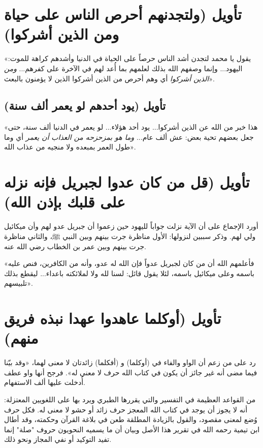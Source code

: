 \separator

\section{تأويل (ولتجدنهم أحرص الناس على حياة ومن الذين أشركوا)}
 «يقول يا محمد لتجدن أشد الناس حرصاً على الحياة في الدنيا وأشدهم كراهة للموت: اليهود... وإنما وصفهم الله بذلك لعلمهم بما أُعد لهم في الآخرة على كفرهم... \textit{ومن الذين أشركوا} أي وهم أحرص من الذين أشركوا الذين لا يؤمنون بالبعث».

\subsection{تأويل (يود أحدهم لو يعمر ألف سنة)}
 «هذا خبر من الله عن الذين أشركوا... يود أحد هؤلاء... لو يعمر في الدنيا ألف سنة، حتى جعل بعضهم تحية بعض: عش ألف عام... \textit{وما هو بمزحزحه من العذاب أن يعمر} أي وما طول العمر بمبعده ولا منجيه من عذاب الله».

\separator

\section{تأويل (قل من كان عدوا لجبريل فإنه نزله على قلبك بإذن الله)}
أورد  الإجماع على أن الآية نزلت جواباً لليهود حين زعموا أن جبريل عدو لهم وأن ميكائيل ولي لهم. وذكر سببين لنزولها: الأول مناظرة جرت بينهم وبين النبي ﷺ، والثاني مناظرة جرت بينهم وبين عمر بن الخطاب رضي الله عنه.

 «فأعلمهم الله أن من كان لجبريل عدواً فإن الله له عدو، وأنه من الكافرين، فنص عليه باسمه وعلى ميكائيل باسمه، لئلا يقول قائل: لسنا لله ولا لملائكته باعداء... ليقطع بذلك تلبيسهم».

\separator

\section{تأويل (أوكلما عاهدوا عهدا نبذه فريق منهم)}
رد  على من زعم أن الواو والفاء في (أوكلما) و (أفكلما) زائدتان لا معنى لهما،  «وقد بيّنا فيما مضى أنه غير جائز أن يكون في كتاب الله حرف لا معنى له». فرجح أنها واو عطف أُدخلت عليها ألف الاستفهام.

\begin{fawaid}
من القواعد العظيمة في التفسير والتي يقررها الطبري ويرد بها على اللغويين المعتزلة: أنه لا يجوز أن يوجد في كتاب الله المعجز حرف زائد أو حشو لا معنى له. فكل حرف وُضع لمعنى مقصود، والقول بالزيادة المطلقة طعن في بلاغة القرآن وحكمته، وقد أطال ابن تيمية رحمه الله في تقرير هذا الأصل وبيان أن ما يسميه النحويون حروف "صلة" إنما تفيد التوكيد أو نفي المجاز ونحو ذلك.
\end{fawaid}

